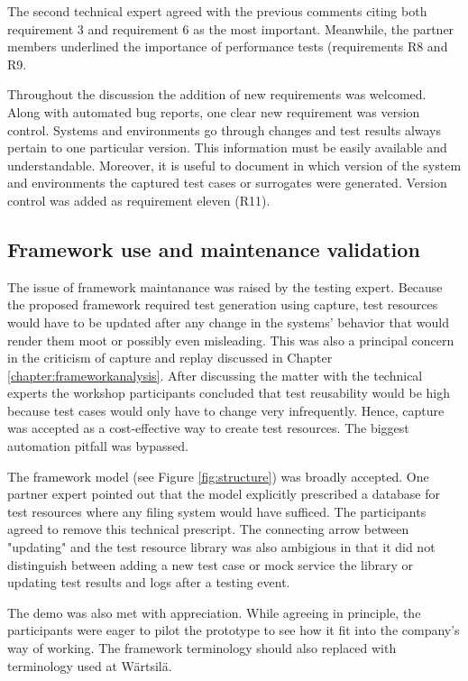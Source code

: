 \documentclass[12pt,a4paper,oneside,pdftex]{report}
\begin{document}
{%
The second technical expert agreed with the previous comments citing both requirement 3 and requirement 6 as the most important. Meanwhile, the partner members underlined the importance of performance tests (requirements R8 and R9.

Throughout the discussion the addition of new requirements was welcomed. Along with automated bug reports, one clear new requirement was version control. Systems and environments go through changes and test results always pertain to one particular version. This information must be easily available and understandable. Moreover, it is useful to document in which version of the system and environments the captured test cases or surrogates were generated. Version control was added as requirement eleven (R11).

\subsection{Framework use and maintenance validation}

The issue of framework maintanance was raised by the testing expert. Because the proposed framework required test generation using capture, test resources would have to be updated after any change in the systems' behavior that would render them moot or possibly even misleading. This was also a principal concern in the criticism of capture and replay discussed in Chapter \ref{chapter:frameworkanalysis}. After discussing the matter with the technical experts the workshop participants concluded that test reusability would be high because test cases would only have to change very infrequently. Hence, capture was accepted as a cost-effective way to create test resources. The biggest automation pitfall was bypassed.

The framework model (see Figure \ref{fig:structure}) was broadly accepted. One partner expert pointed out that the model explicitly prescribed a database for test resources where any filing system would have sufficed. The participants agreed to remove this technical prescript. The connecting arrow between "updating" and the test resource library was also ambigious in that it did not distinguish between adding a new test case or mock service the library or updating test results and logs after a testing event.

The demo was also met with appreciation. While agreeing in principle, the participants were eager to pilot the prototype to see how it fit into the company's way of working. The framework terminology should also replaced with terminology used at Wärtsilä.

}
\end{document}
